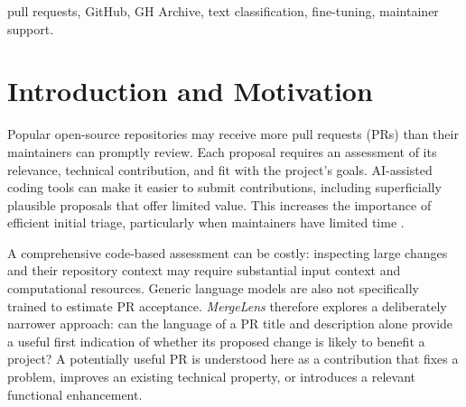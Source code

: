\documentclass[conference,a4paper,flushend]{cs-techrep}
\begin{document}
\selectlanguage{\cstechrepLang}
\maketitle

\begin{abstract}
Maintainers of active GitHub repositories must assess numerous pull requests (PRs), including proposals of uncertain value. \emph{MergeLens} investigates whether a compact, fine-tuned language model can provide an early indication of a PR's potential usefulness using only its English title and description. Historical GH Archive events will supply labeled examples based on observed merge outcomes. The proposed system comprises a reproducible data-processing and training pipeline, a containerized inference service, and a web interface for maintainer-triggered predictions. Its predictive value will be assessed on held-out data; it is intended to support, not replace, human review.
\end{abstract}

\begin{IEEEkeywords}
pull requests, GitHub, GH Archive, text classification, fine-tuning, maintainer support.
\end{IEEEkeywords}

\section{Introduction and Motivation}
Popular open-source repositories may receive more pull requests (PRs) than their maintainers can promptly review. Each proposal requires an assessment of its relevance, technical contribution, and fit with the project's goals. AI-assisted coding tools can make it easier to submit contributions, including superficially plausible proposals that offer limited value. This increases the importance of efficient initial triage, particularly when maintainers have limited time \cite{baltes2026aislop}.

A comprehensive code-based assessment can be costly: inspecting large changes and their repository context may require substantial input context and computational resources. Generic language models are also not specifically trained to estimate PR acceptance. \emph{MergeLens} therefore explores a deliberately narrower approach: can the language of a PR title and description alone provide a useful first indication of whether its proposed change is likely to benefit a project? A potentially useful PR is understood here as a contribution that fixes a problem, improves an existing technical property, or introduces a relevant functional enhancement.
\end{document}

